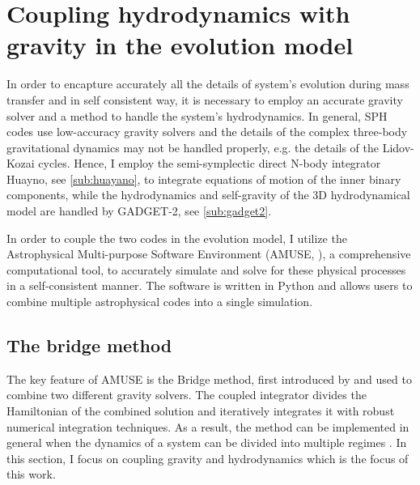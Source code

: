 \section{Coupling hydrodynamics with gravity in the evolution model}

In order to encapture accurately all the details of system's evolution during mass transfer and in self consistent way, it is necessary to employ an accurate gravity solver and a method to handle the system's hydrodynamics. In general, SPH codes use low-accuracy gravity solvers and the details of the complex three-body gravitational dynamics may not be handled properly, e.g. the details of the Lidov-Kozai cycles. Hence, I employ the semi-symplectic direct N-body integrator Huayno, see \cref{sub:huayano}, to integrate equations of motion of the inner binary components, while the hydrodynamics and self-gravity of the 3D hydrodynamical model are handled by GADGET-2, see \cref{sub:gadget2}. 

In order to couple the two codes in the evolution model, I utilize the Astrophysical Multi-purpose Software Environment (AMUSE, \cite{pelupessy2013astrophysical,portegies2018astrophysical}), a comprehensive computational tool, to accurately simulate and solve for these physical processes in a self-consistent manner.  The software is written in Python and allows users to combine multiple astrophysical codes into a single simulation. 

\subsection{The bridge method}

The key feature of AMUSE is the Bridge method, first introduced by \cite{fujii2007bridge} and used to combine two different gravity solvers. The coupled integrator divides the Hamiltonian of the combined solution and iteratively integrates it with robust numerical integration techniques. As a result, the method can be implemented in general when the dynamics of a system can be divided into multiple regimes \citep{zwart2013multi}. In this section, I focus on coupling gravity and hydrodynamics which is the focus of this work.

